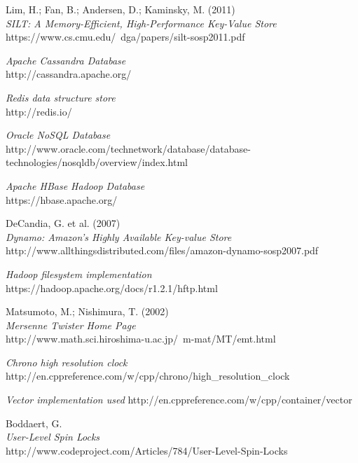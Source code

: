 \documentclass[11pt]{article} %
\begin{document}
\begin{thebibliography}{99}
 Lim, H.; Fan, B.; Andersen, D.; Kaminsky, M. (2011)\\
 \emph{SILT: A Memory-Efficient, High-Performance Key-Value Store}\\
 https://www.cs.cmu.edu/~dga/papers/silt-sosp2011.pdf

 \emph{Apache Cassandra Database}\\
 http://cassandra.apache.org/

 \emph{Redis data structure store}\\
 http://redis.io/

 \emph{Oracle NoSQL Database}\\
 http://www.oracle.com/technetwork/database/database-technologies/nosqldb/overview/index.html

 \emph{Apache HBase Hadoop Database} \\
 https://hbase.apache.org/

 DeCandia, G. et al. (2007)\\
 \emph{Dynamo: Amazon’s Highly Available Key-value Store}\\
 http://www.allthingsdistributed.com/files/amazon-dynamo-sosp2007.pdf

 \emph{Hadoop filesystem implementation}\\
 https://hadoop.apache.org/docs/r1.2.1/hftp.html

 Matsumoto, M.; Nishimura, T. (2002) \\
 \emph{Mersenne Twister Home Page} \\
 http://www.math.sci.hiroshima-u.ac.jp/~m-mat/MT/emt.html

 \emph{Chrono high resolution clock} \\
 http://en.cppreference.com/w/cpp/chrono/high\_resolution\_clock

\emph{Vector implementation used}
http://en.cppreference.com/w/cpp/container/vector

 Boddaert, G. \\
 \emph{User-Level Spin Locks} \\
 http://www.codeproject.com/Articles/784/User-Level-Spin-Locks
\end{thebibliography}
\end{document}
